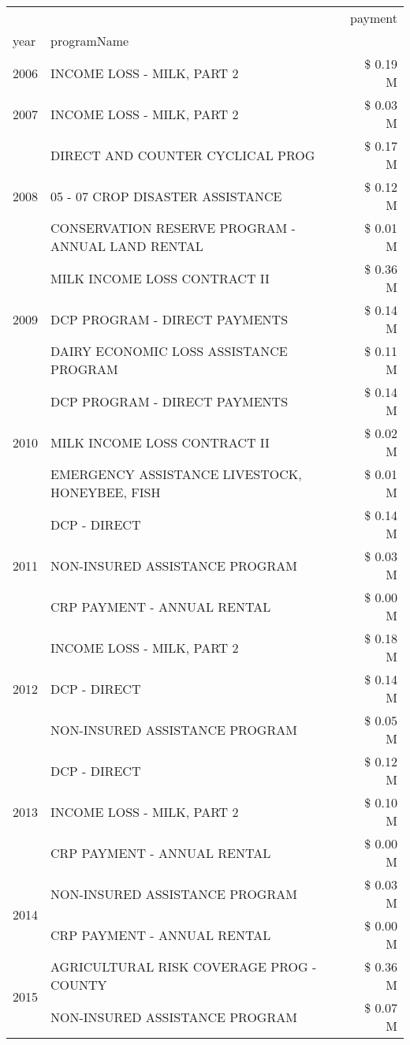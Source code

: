 \begin{tabular}{llr}
\toprule
 &  & payment \\
year & programName &  \\
\midrule
2006 & INCOME LOSS - MILK, PART 2 & \$ 0.19 M \\
\cline{1-3}
2007 & INCOME LOSS - MILK, PART 2 & \$ 0.03 M \\
\cline{1-3}
\multirow[t]{3}{*}{2008} & DIRECT AND COUNTER CYCLICAL PROG & \$ 0.17 M \\
 & 05 - 07 CROP DISASTER ASSISTANCE & \$ 0.12 M \\
 & CONSERVATION RESERVE PROGRAM - ANNUAL LAND RENTAL & \$ 0.01 M \\
\cline{1-3}
\multirow[t]{3}{*}{2009} & MILK INCOME LOSS CONTRACT II & \$ 0.36 M \\
 & DCP PROGRAM - DIRECT PAYMENTS & \$ 0.14 M \\
 & DAIRY ECONOMIC LOSS ASSISTANCE PROGRAM & \$ 0.11 M \\
\cline{1-3}
\multirow[t]{3}{*}{2010} & DCP PROGRAM - DIRECT PAYMENTS & \$ 0.14 M \\
 & MILK INCOME LOSS CONTRACT II & \$ 0.02 M \\
 & EMERGENCY ASSISTANCE LIVESTOCK, HONEYBEE, FISH & \$ 0.01 M \\
\cline{1-3}
\multirow[t]{3}{*}{2011} & DCP - DIRECT & \$ 0.14 M \\
 & NON-INSURED ASSISTANCE PROGRAM & \$ 0.03 M \\
 & CRP PAYMENT - ANNUAL RENTAL & \$ 0.00 M \\
\cline{1-3}
\multirow[t]{3}{*}{2012} & INCOME LOSS - MILK, PART 2 & \$ 0.18 M \\
 & DCP - DIRECT & \$ 0.14 M \\
 & NON-INSURED ASSISTANCE PROGRAM & \$ 0.05 M \\
\cline{1-3}
\multirow[t]{3}{*}{2013} & DCP - DIRECT & \$ 0.12 M \\
 & INCOME LOSS - MILK, PART 2 & \$ 0.10 M \\
 & CRP PAYMENT - ANNUAL RENTAL & \$ 0.00 M \\
\cline{1-3}
\multirow[t]{2}{*}{2014} & NON-INSURED ASSISTANCE PROGRAM & \$ 0.03 M \\
 & CRP PAYMENT - ANNUAL RENTAL & \$ 0.00 M \\
\cline{1-3}
\multirow[t]{3}{*}{2015} & AGRICULTURAL RISK COVERAGE PROG - COUNTY & \$ 0.36 M \\
 & NON-INSURED ASSISTANCE PROGRAM & \$ 0.07 M \\

\end{tabular}
